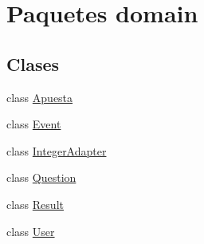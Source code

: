 \hypertarget{namespacedomain}{}\section{Paquetes domain}
\label{namespacedomain}
\subsection*{Clases}
\begin{DoxyCompactItemize}
\item 
class \mbox{\hyperlink{classdomain_1_1Apuesta}{Apuesta}}
\item 
class \mbox{\hyperlink{classdomain_1_1Event}{Event}}
\item 
class \mbox{\hyperlink{classdomain_1_1IntegerAdapter}{Integer\+Adapter}}
\item 
class \mbox{\hyperlink{classdomain_1_1Question}{Question}}
\item 
class \mbox{\hyperlink{classdomain_1_1Result}{Result}}
\item 
class \mbox{\hyperlink{classdomain_1_1User}{User}}
\end{DoxyCompactItemize}
